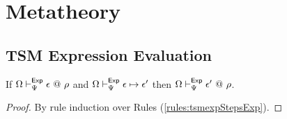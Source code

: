 \section{Metatheory}\label{appendix:metatheory-P}
\subsection{TSM Expression Evaluation}
\begin{theorem}
\label{thm:peTSM-preservation}
If $\Omega \vdash_{\Psi}^{\mathsf{Exp}} \epsilon ~@~ \rho$ and $\Omega \vdash_{\Psi}^\mathsf{Exp} \epsilon \mapsto \epsilon'$ then $\Omega \vdash_{\Psi}^{\mathsf{Exp}} \epsilon' ~@~ \rho$.
\end{theorem}
\begin{proof}
By rule induction over Rules (\ref{rules:tsmexpStepsExp}).


\end{proof}
